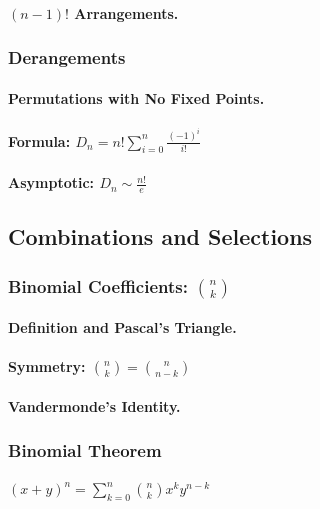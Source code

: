 \paragraph{$(n-1)!$ Arrangements.}

\subsubsection{Derangements}
\paragraph{Permutations with No Fixed Points.}
\paragraph{Formula: $D_n = n! \sum_{i=0}^{n} \frac{(-1)^i}{i!}$}
\paragraph{Asymptotic: $D_n \sim \frac{n!}{e}$}

\subsection{Combinations and Selections}
\label{subsec:combinations}

\subsubsection{Binomial Coefficients: $\binom{n}{k}$}
\paragraph{Definition and Pascal's Triangle.}
\paragraph{Symmetry: $\binom{n}{k} = \binom{n}{n-k}$}
\paragraph{Vandermonde's Identity.}

\subsubsection{Binomial Theorem}
\paragraph{$(x+y)^n = \sum_{k=0}^{n} \binom{n}{k} x^k y^{n-k}$}
